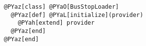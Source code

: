 \begin{Verbatim}[commandchars=@\[\]]
@PYaz[class] @PYaO[BusStopLoader]
  @PYaz[def] @PYaL[initialize](provider)
    @PYah[extend] provider
  @PYaz[end]
@PYaz[end]
\end{Verbatim}
